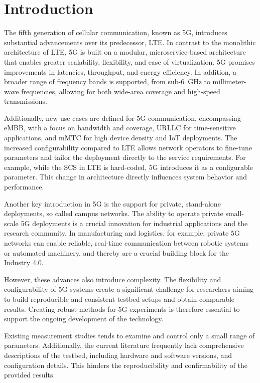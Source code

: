 
\chapter{Introduction}\label{chap:introduction}

The fifth generation of cellular communication, known as 5G, introduces substantial advancements over its predecessor, \gls{LTE}.
In contrast to the monolithic architecture of \gls{LTE}, 5G is built on a modular, microservice-based architecture that enables greater
scalability, flexibility, and ease of virtualization.
5G promises improvements in latencies, throughput, and energy efficiency.
In addition, a broader range of frequency bands is supported, from sub-\SI{6}{\giga\hertz} to millimeter-wave frequencies,
allowing for both wide-area coverage and high-speed transmissions.

Additionally, new use cases are defined for 5G communication, encompassing \gls{eMBB}, with a focus on
bandwidth and coverage, \gls{URLLC} for time-sensitive applications, and \gls{mMTC} for high device density and \gls{IoT} deployments.
The increased configurability compared to \gls{LTE} allows network operators to fine-tune parameters and tailor
the deployment directly to the service requirements.
For example, while the \gls{SCS} in \gls{LTE} is hard-coded, 5G introduces it as a configurable parameter.
This change in architecture directly influences system behavior and performance.

Another key introduction in 5G is the support for private, stand-alone deployments, so called campus networks.
The ability to operate private small-scale 5G deployments is a crucial innovation for industrial applications and the research community.
In manufacturing and logistics, for example, private 5G networks can enable reliable,
real-time communication between robotic systems or automated machinery, and thereby are a crucial building block for the Industry 4.0.

However, these advances also introduce complexity.
The flexibility and configurability of 5G systems create a significant challenge for researchers aiming to build
reproducible and consistent testbed setups and obtain comparable results.
Creating robust methods for 5G experiments is therefore essential to support the ongoing development of the technology.

Existing measurement studies tends to examine and control only a small range of parameters.
Additionally, the current literature frequently lack comprehensive descriptions of the testbed, including hardware and software versions, and configuration details.
This hinders the reproducibility and confirmability of the provided results.


